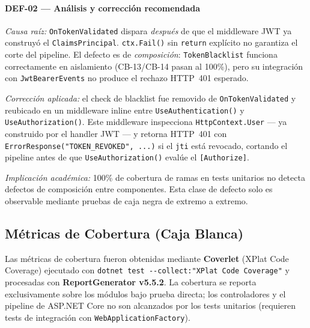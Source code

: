 \documentclass[11pt,a4paper]{article}
\begin{document}
\vspace{0.3cm}

{\sloppy
\paragraph*{DEF-02 — Análisis y corrección recomendada}

\textit{Causa raíz:} \texttt{OnTokenValidated} dispara \emph{después} de que el middleware JWT
ya construyó el \texttt{ClaimsPrincipal}. \texttt{ctx.Fail()} sin \texttt{return} explícito
no garantiza el corte del pipeline. El defecto es de \emph{composición}: \texttt{TokenBlacklist}
funciona correctamente en aislamiento (CB-13/CB-14 pasan al 100\%), pero su integración con
\texttt{JwtBearerEvents} no produce el rechazo HTTP~401 esperado.

\textit{Corrección aplicada:} el check de blacklist fue removido de \texttt{OnTokenValidated}
y reubicado en un middleware inline entre \texttt{UseAuthentication()} y
\texttt{UseAuthorization()}. Este middleware inspecciona \texttt{HttpContext.User} —
ya construido por el handler JWT — y retorna HTTP~401 con
\texttt{ErrorResponse("TOKEN\_REVOKED",~...)} si el \texttt{jti} está revocado,
cortando el pipeline antes de que \texttt{UseAuthorization()} evalúe el \texttt{[Authorize]}.

\textit{Implicación académica:} 100\% de cobertura de ramas en tests unitarios no detecta
defectos de composición entre componentes. Esta clase de defecto solo es observable mediante
pruebas de caja negra de extremo a extremo.
}%

\subsection{Métricas de Cobertura (Caja Blanca)}

\noindent Las métricas de cobertura fueron obtenidas mediante \textbf{Coverlet} (XPlat Code Coverage) ejecutado con \texttt{dotnet test -{}-collect:"XPlat Code Coverage"} y procesadas con \textbf{ReportGenerator v5.5.2}. La cobertura se reporta exclusivamente sobre los módulos bajo prueba directa; los controladores y el pipeline de ASP.NET Core no son alcanzados por los tests unitarios (requieren tests de integración con \texttt{WebApplicationFactory}).
\end{document}
